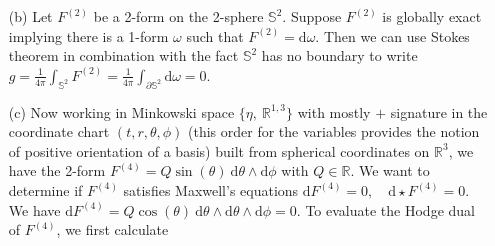 \documentclass[10pt, a4paper]{article}
\begin{document}
{\begin{enumerate}
  \textbf{Counterexample:} Consider the circle smooth manifold $\mathbb{S}^1 \subset \mathbb{R}^2$ (embeded as $\{x^2 + y^2 = 1|(x, y)\in\mathbb{R}^2\}$ for simplicity). It takes at least two charts to cover this manifold and, although on individual charts all closed 1-forms are exact (charts make the manifold look like $\mathbb{R}$ locally), this property is lost globally. Choose the chart map $\theta = \arctan_2$ sending points $(x, y)$ on the circle to their angle with the $x$ axis excluding the point $(1, 0)$ so that the domain is open. With this chart we have the coordinate induced one form frame field $\text{d}\theta$ which we use to construct the closed form $\omega = \text{d}\theta$. On $(0, 2\pi)$, this form is exact since we have a $0$-form $\lambda =  F \in C^{\infty}((0, 2\pi))$ such that $\omega = \text{d}\lambda = \partial_\theta F \text{d}\theta = \text{d}\theta$ forcing $F = \theta + c$, $c \in \mathbb{R}$ since $F$ has to be a primitive of $1$ in the variable $\theta$. The function $F$ is smooth on the chart, but can never be extended to s smooth function over $\mathbb{S}^1$ globally. Indeed, $0$ and $2\pi$ being identified, a continuous function on $\mathbb{S}^1$ should be consistant at the excluded point $(0, 1)$ and this would requiere  $\lim_{\theta \to 0+} (\theta + c) = \lim_{\theta \to 2\pi^-} (\theta + c)$ which is impossible. Therefore there is a closed form on $\mathbb{S}^1$ that is not exact. 
  \item[(b)] Let $F^{(2)}$ be a 2-form on the 2-sphere $\mathbb{S}^2$. Suppose $F^{(2)}$ is globally exact implying there is a 1-form $\omega$ such that $F^{(2)} = \text{d}\omega$. Then we can use Stokes theorem in combination with the fact $\mathbb{S}^2$ has no boundary to write $g= \frac{1}{4\pi} \int_{\mathbb{S}^2} F^{(2)} = \frac{1}{4\pi} \int_{\partial \mathbb{S}^2} \text{d}\omega = 0$. 
  \item[(c)] Now working in Minkowski space $\{\eta,\ \mathbb{R}^{1, 3}\}$ with mostly $+$ signature in the coordinate chart $(t, r, \theta, \phi)$ (this order for the variables provides the notion of positive orientation of a basis) built from spherical coordinates on $\mathbb{R}^3$, we have the 2-form $F^{(4)} = Q \sin(\theta)\ \text{d}\theta \wedge \text{d}\phi$ with $Q\in \mathbb{R}$. We want to determine if $F^{(4)}$ satisfies Maxwell's equations $\text{d} F^{(4)}=0, \quad \text{d} \star F^{(4)}=0$. We have $\text{d} F^{(4)} =  Q \cos(\theta) \ \text{d}\theta \wedge \text{d}\theta \wedge \text{d}\phi = 0$. To evaluate the Hodge dual of $F^{(4)}$, we first calculate 

\end{enumerate}}
\end{document}
